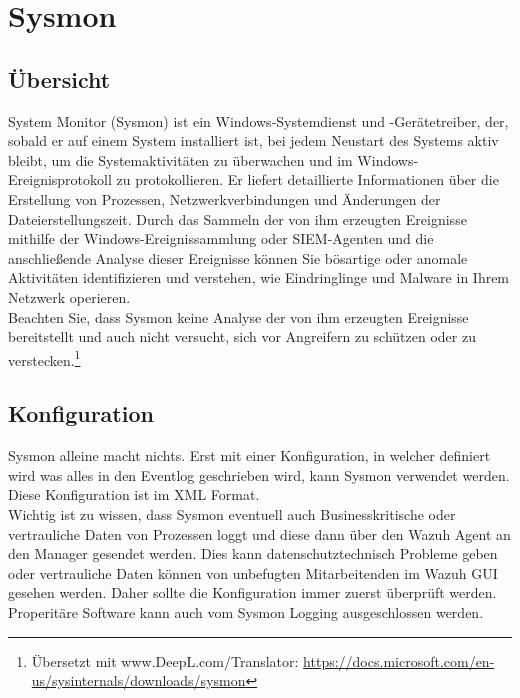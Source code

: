 \chapter{Sysmon}
\section{Übersicht}
System Monitor (Sysmon) ist ein Windows-Systemdienst und -Gerätetreiber, der, sobald er auf einem System installiert ist, bei jedem Neustart des Systems aktiv bleibt, um die Systemaktivitäten zu überwachen und im Windows-Ereignisprotokoll zu protokollieren. Er liefert detaillierte Informationen über die Erstellung von Prozessen, Netzwerkverbindungen und Änderungen der Dateierstellungszeit. Durch das Sammeln der von ihm erzeugten Ereignisse mithilfe der Windows-Ereignissammlung oder SIEM-Agenten und die anschließende Analyse dieser Ereignisse können Sie bösartige oder anomale Aktivitäten identifizieren und verstehen, wie Eindringlinge und Malware in Ihrem Netzwerk operieren.\\

Beachten Sie, dass Sysmon keine Analyse der von ihm erzeugten Ereignisse bereitstellt und auch nicht versucht, sich vor Angreifern zu schützen oder zu verstecken.\footnote{Übersetzt mit www.DeepL.com/Translator: \href{https://docs.microsoft.com/en-us/sysinternals/downloads/sysmon}{https://docs.microsoft.com/en-us/sysinternals/downloads/sysmon}}

\section{Konfiguration}
Sysmon alleine macht nichts. 
Erst mit einer Konfiguration, in welcher definiert wird was alles in den Eventlog geschrieben wird, kann Sysmon verwendet werden.
Diese Konfiguration ist im XML Format. \\

Wichtig ist zu wissen, dass Sysmon eventuell auch Businesskritische oder vertrauliche Daten von Prozessen loggt und diese dann über den Wazuh Agent an den Manager gesendet werden.
Dies kann datenschutztechnisch Probleme geben oder vertrauliche Daten können von unbefugten Mitarbeitenden im Wazuh GUI gesehen werden.
Daher sollte die Konfiguration immer zuerst überprüft werden.
Properitäre Software kann auch vom Sysmon Logging ausgeschlossen werden.
